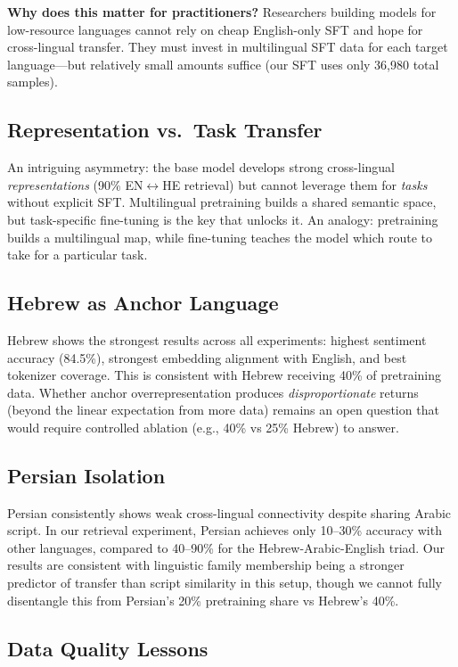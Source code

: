 \documentclass[10pt,twocolumn]{article}
\begin{document}
\textbf{Why does this matter for practitioners?} Researchers building models for low-resource languages cannot rely on cheap English-only SFT and hope for cross-lingual transfer. They must invest in multilingual SFT data for each target language---but relatively small amounts suffice (our SFT uses only 36,980 total samples).

\subsection{Representation vs.\ Task Transfer}

An intriguing asymmetry: the base model develops strong cross-lingual \emph{representations} (90\% EN$\leftrightarrow$HE retrieval) but cannot leverage them for \emph{tasks} without explicit SFT. Multilingual pretraining builds a shared semantic space, but task-specific fine-tuning is the key that unlocks it. An analogy: pretraining builds a multilingual map, while fine-tuning teaches the model which route to take for a particular task.

\subsection{Hebrew as Anchor Language}

Hebrew shows the strongest results across all experiments: highest sentiment accuracy (84.5\%), strongest embedding alignment with English, and best tokenizer coverage. This is consistent with Hebrew receiving 40\% of pretraining data. Whether anchor overrepresentation produces \emph{disproportionate} returns (beyond the linear expectation from more data) remains an open question that would require controlled ablation (e.g., 40\% vs 25\% Hebrew) to answer.

\subsection{Persian Isolation}

Persian consistently shows weak cross-lingual connectivity despite sharing Arabic script. In our retrieval experiment, Persian achieves only 10--30\% accuracy with other languages, compared to 40--90\% for the Hebrew-Arabic-English triad. Our results are consistent with linguistic family membership being a stronger predictor of transfer than script similarity in this setup, though we cannot fully disentangle this from Persian's 20\% pretraining share vs Hebrew's 40\%.

\subsection{Data Quality Lessons}
\label{sec:data_lessons}
\end{document}
